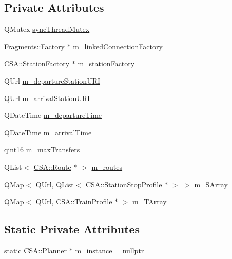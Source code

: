 \subsection*{Private Attributes}
\begin{DoxyCompactItemize}
\item 
Q\+Mutex \mbox{\hyperlink{classCSA_1_1Planner_adfeb70ddbedfbb37567b852aa7b8cbe3}{sync\+Thread\+Mutex}}
\item 
\mbox{\hyperlink{classFragments_1_1Factory}{Fragments\+::\+Factory}} $\ast$ \mbox{\hyperlink{classCSA_1_1Planner_a125612862843283f437f76dbc2ae56ba}{m\+\_\+linked\+Connection\+Factory}}
\item 
\mbox{\hyperlink{classCSA_1_1StationFactory}{C\+S\+A\+::\+Station\+Factory}} $\ast$ \mbox{\hyperlink{classCSA_1_1Planner_a14aa8633412e69b1b26624ae4a63a478}{m\+\_\+station\+Factory}}
\item 
Q\+Url \mbox{\hyperlink{classCSA_1_1Planner_aa5eb52a86c4d14053de75f4b293409fa}{m\+\_\+departure\+Station\+U\+RI}}
\item 
Q\+Url \mbox{\hyperlink{classCSA_1_1Planner_a8f0231d1da5fc7451ef9127970ec3ff1}{m\+\_\+arrival\+Station\+U\+RI}}
\item 
Q\+Date\+Time \mbox{\hyperlink{classCSA_1_1Planner_a79f5a12513524607b1fbbdcf9bd4162d}{m\+\_\+departure\+Time}}
\item 
Q\+Date\+Time \mbox{\hyperlink{classCSA_1_1Planner_a96a9ae70c8919e65e81cd095355a7ea0}{m\+\_\+arrival\+Time}}
\item 
qint16 \mbox{\hyperlink{classCSA_1_1Planner_a4b24326fa4784c61865526532935cd97}{m\+\_\+max\+Transfers}}
\item 
Q\+List$<$ \mbox{\hyperlink{classCSA_1_1Route}{C\+S\+A\+::\+Route}} $\ast$ $>$ \mbox{\hyperlink{classCSA_1_1Planner_af978da0a218f6eecf870e8f4a3d6d294}{m\+\_\+routes}}
\item 
Q\+Map$<$ Q\+Url, Q\+List$<$ \mbox{\hyperlink{classCSA_1_1StationStopProfile}{C\+S\+A\+::\+Station\+Stop\+Profile}} $\ast$ $>$ $>$ \mbox{\hyperlink{classCSA_1_1Planner_adfc501aa7ae4f55c3fab20890e6bb980}{m\+\_\+\+S\+Array}}
\item 
Q\+Map$<$ Q\+Url, \mbox{\hyperlink{classCSA_1_1TrainProfile}{C\+S\+A\+::\+Train\+Profile}} $\ast$ $>$ \mbox{\hyperlink{classCSA_1_1Planner_a9787a967e79e8efb703bdf5e2e5718c7}{m\+\_\+\+T\+Array}}
\end{DoxyCompactItemize}
\subsection*{Static Private Attributes}
\begin{DoxyCompactItemize}
\item 
static \mbox{\hyperlink{classCSA_1_1Planner}{C\+S\+A\+::\+Planner}} $\ast$ \mbox{\hyperlink{classCSA_1_1Planner_a85076417b9aca86ba069c447e3ecdaa0}{m\+\_\+instance}} = nullptr
\end{DoxyCompactItemize}


